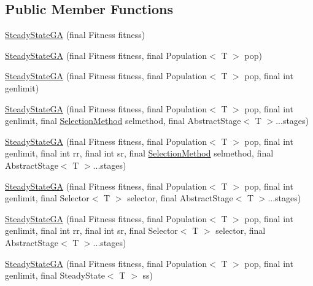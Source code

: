 \subsection*{Public Member Functions}
\begin{CompactItemize}
\item 
\hyperlink{classjenes_1_1algorithms_1_1_steady_state_g_a_3_01_t_01extends_01_chromosome_01_4_0bd9f9195ccd7bb9f0a93bf467ee81d5}{SteadyStateGA} (final Fitness fitness)
\item 
\hyperlink{classjenes_1_1algorithms_1_1_steady_state_g_a_3_01_t_01extends_01_chromosome_01_4_1fab107de8499953af703b619d2fc741}{SteadyStateGA} (final Fitness fitness, final Population$<$ T $>$ pop)
\item 
\hyperlink{classjenes_1_1algorithms_1_1_steady_state_g_a_3_01_t_01extends_01_chromosome_01_4_6dba077ffc454a1863b7d15cecac32b4}{SteadyStateGA} (final Fitness fitness, final Population$<$ T $>$ pop, final int genlimit)
\item 
\hyperlink{classjenes_1_1algorithms_1_1_steady_state_g_a_3_01_t_01extends_01_chromosome_01_4_5964a47d26b5831b9e821285e3e4cb8d}{SteadyStateGA} (final Fitness fitness, final Population$<$ T $>$ pop, final int genlimit, final \hyperlink{classjenes_1_1algorithms_1_1_steady_state_g_a_3_01_t_01extends_01_chromosome_01_4_e3534264ad652fd69b6d2a619b16e13b}{SelectionMethod} selmethod, final AbstractStage$<$ T $>$...stages)
\item 
\hyperlink{classjenes_1_1algorithms_1_1_steady_state_g_a_3_01_t_01extends_01_chromosome_01_4_7f95aed43d04c3290cc5fd98a569b6e0}{SteadyStateGA} (final Fitness fitness, final Population$<$ T $>$ pop, final int genlimit, final int rr, final int sr, final \hyperlink{classjenes_1_1algorithms_1_1_steady_state_g_a_3_01_t_01extends_01_chromosome_01_4_e3534264ad652fd69b6d2a619b16e13b}{SelectionMethod} selmethod, final AbstractStage$<$ T $>$...stages)
\item 
\hyperlink{classjenes_1_1algorithms_1_1_steady_state_g_a_3_01_t_01extends_01_chromosome_01_4_8dbf144ebf5f83e8d67e1e74c0e8c630}{SteadyStateGA} (final Fitness fitness, final Population$<$ T $>$ pop, final int genlimit, final Selector$<$ T $>$ selector, final AbstractStage$<$ T $>$...stages)
\item 
\hyperlink{classjenes_1_1algorithms_1_1_steady_state_g_a_3_01_t_01extends_01_chromosome_01_4_24e8cfdd1131b63cb1c3d086a6a09cf4}{SteadyStateGA} (final Fitness fitness, final Population$<$ T $>$ pop, final int genlimit, final int rr, final int sr, final Selector$<$ T $>$ selector, final AbstractStage$<$ T $>$...stages)
\item 
\hyperlink{classjenes_1_1algorithms_1_1_steady_state_g_a_3_01_t_01extends_01_chromosome_01_4_8e1b8939ca23670640b050dae1e239cc}{SteadyStateGA} (final Fitness fitness, final Population$<$ T $>$ pop, final int genlimit, final SteadyState$<$ T $>$ ss)
\end{CompactItemize}
